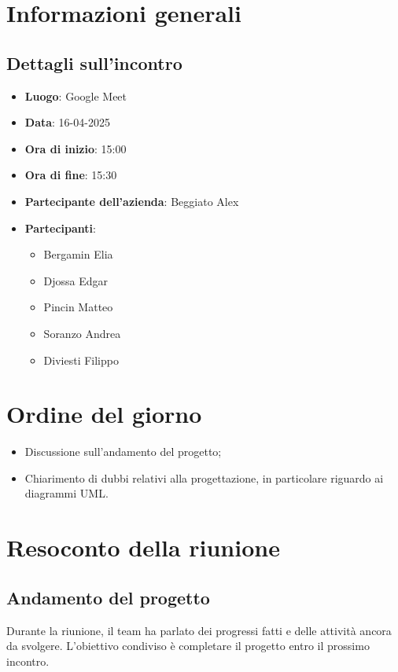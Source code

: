 \section{Informazioni generali}
\subsection{Dettagli sull'incontro}
\begin{itemize}
    \item \textbf{Luogo}: Google Meet
    \item \textbf{Data}: 16-04-2025
    \item \textbf{Ora di inizio}: 15:00
    \item \textbf{Ora di fine}: 15:30
    \item \textbf{Partecipante dell'azienda}: Beggiato Alex
    \item \textbf{Partecipanti}:
    \begin{itemize}
        \item Bergamin Elia
        \item Djossa Edgar
        \item Pincin Matteo 
        \item Soranzo Andrea  
        \item Diviesti Filippo
    \end{itemize}
\end{itemize}

\section{Ordine del giorno}
\begin{itemize}
\item Discussione sull'andamento del progetto;
\item Chiarimento di dubbi relativi alla progettazione, in particolare riguardo ai diagrammi UML.
\end{itemize}

\section{Resoconto della riunione}

\subsection{Andamento del progetto}

Durante la riunione, il team ha parlato dei progressi fatti e delle attività ancora da svolgere. L’obiettivo condiviso è completare il progetto entro il prossimo incontro.

